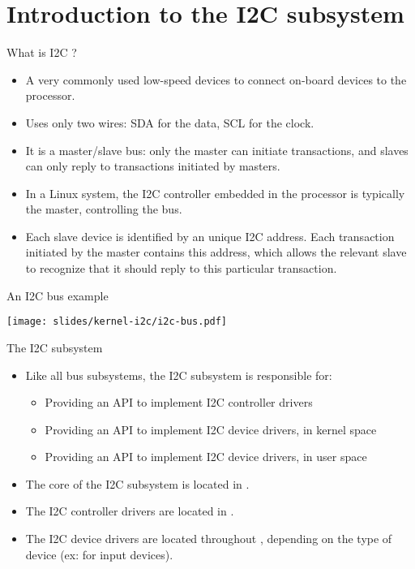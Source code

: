 \section{Introduction to the I2C subsystem}

\begin{frame}{What is I2C ?}
  \begin{itemize}
  \item A very commonly used low-speed devices to connect on-board
    devices to the processor.
  \item Uses only two wires: SDA for the data, SCL for the clock.
  \item It is a master/slave bus: only the master can initiate
    transactions, and slaves can only reply to transactions initiated
    by masters.
  \item In a Linux system, the I2C controller embedded in the
    processor is typically the master, controlling the bus.
  \item Each slave device is identified by an unique I2C address. Each
    transaction initiated by the master contains this address, which
    allows the relevant slave to recognize that it should reply to
    this particular transaction.
  \end{itemize}
\end{frame}

\begin{frame}{An I2C bus example}
  \begin{center}
    \texttt{[image: slides/kernel-i2c/i2c-bus.pdf]}
  \end{center}
\end{frame}

\begin{frame}{The I2C subsystem}
  \begin{itemize}
  \item Like all bus subsystems, the I2C subsystem is responsible for:
    \begin{itemize}
    \item Providing an API to implement I2C controller drivers
    \item Providing an API to implement I2C device drivers, in kernel space
    \item Providing an API to implement I2C device drivers, in user space
    \end{itemize}
  \item The core of the I2C subsystem is located in
    .
  \item The I2C controller drivers are located in
    .
  \item The I2C device drivers are located throughout
    , depending on the type of device (ex:
     for input devices).
  \end{itemize}
\end{frame}

